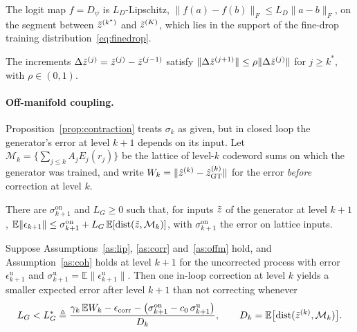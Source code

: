 \begin{assumption}\label{as:dec}
The logit map $f=D_\psi$ is $L_D$-Lipschitz, $\|f(a)-f(b)\|_F\le L_D\|a-b\|_F$, on the segment between $\tilde{z}^{(k^\ast)}$ and $\tilde{z}^{(K)}$, which lies in the support of the fine-drop training distribution~\eqref{eq:finedrop}.
\end{assumption}
\begin{assumption}\label{as:geo}
The increments $\Delta\tilde{z}^{(j)}=\tilde{z}^{(j)}-\tilde{z}^{(j-1)}$ satisfy $\|\Delta\tilde{z}^{(j+1)}\|\le\rho\|\Delta\tilde{z}^{(j)}\|$ for $j\ge k^\ast$, with $\rho\in(0,1)$.
\end{assumption}

\paragraph{Off-manifold coupling.} Proposition~\ref{prop:contraction} treats $\sigma_k$ as given, but in closed loop the generator's error at level $k+1$ depends on its input. Let $\mathcal{M}_k=\{\sum_{j\le k}A_jE_j(r_j)\}$ be the lattice of level-$k$ codeword sums on which the generator was trained, and write $W_k=\|\hat{z}^{(k)}-\hat{z}^{(k)}_{\mathrm{GT}}\|$ for the error \emph{before} correction at level $k$.
\begin{assumption}\label{as:offm}
There are $\sigma^{\mathrm{on}}_{k+1}$ and $L_G\ge0$ such that, for inputs $\tilde{z}$ of the generator at level $k+1$, $\mathbb{E}\|\epsilon_{k+1}\|\le\sigma^{\mathrm{on}}_{k+1}+L_G\,\mathbb{E}[\mathrm{dist}(\tilde{z},\mathcal{M}_k)]$, with $\sigma^{\mathrm{on}}_{k+1}$ the error on lattice inputs.
\end{assumption}
\begin{corollary}\label{cor:LG}
Suppose Assumptions~\ref{as:lip}, \ref{as:corr} and~\ref{as:offm} hold, and Assumption~\ref{as:coh} holds at level $k+1$ for the uncorrected process with error $\epsilon^{\mathrm{u}}_{k+1}$ and $\sigma^{\mathrm{u}}_{k+1}=\mathbb{E}\|\epsilon^{\mathrm{u}}_{k+1}\|$. Then one in-loop correction at level $k$ yields a smaller expected error after level $k+1$ than not correcting whenever
\begin{equation}
L_G<L_G^{\ast}\triangleq\frac{\gamma_k\,\mathbb{E}W_k-\epsilon_{\mathrm{corr}}-\big(\sigma^{\mathrm{on}}_{k+1}-c_0\,\sigma^{\mathrm{u}}_{k+1}\big)}{D_k},\qquad D_k=\mathbb{E}\big[\mathrm{dist}(\tilde{z}^{(k)},\mathcal{M}_k)\big]. \label{eq:LGthr}
\end{equation}
\end{corollary}
